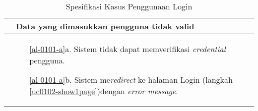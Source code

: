 \begin{table}[H]
\begin{tabular}{|r|p{8cm}|}
		\multicolumn{1}{|l|}{}                                           & \textbf{Data yang dimasukkan pengguna tidak valid}
		\\ \hline
		\multicolumn{1}{|l|}{}                                           & 
		\begin{itemize}
			\item[\ref{al-0101-a}a.] Sistem tidak dapat memverifikasi \textit{credential} pengguna.
			\item[\ref{al-0101-a}b.] Sistem me\textit{redirect} ke halaman Login (langkah \ref{uc0102-show1page})dengan \textit{error message}.
		\end{itemize}
		\\ \hline
	\end{tabular}
	\caption{Spesifikasi Kasus Penggunaan Login }
	\label{uc01.02}
\end{table}